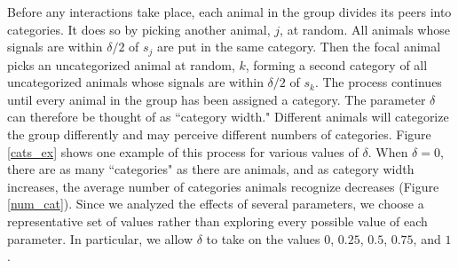 Before any interactions take place, each animal in the group divides its peers into categories. It does so by picking another animal, $j$, at random. All animals whose signals are within $\delta/2$ of $s_j$ are put in the same category. Then the focal animal picks an uncategorized animal at random, $k$, forming a second category of all uncategorized animals whose signals are within $\delta/2$ of $s_k$. The process continues until every animal in the group has been assigned a category. The parameter $\delta$ can therefore be thought of as ``category width."  Different animals will categorize the group differently and may perceive different numbers of categories. Figure \ref{cats_ex} shows one example of this process for various values of $\delta$. When $\delta=0$, there are as many ``categories" as there are animals, and as category width increases, the average number of categories animals recognize decreases (Figure \ref{num_cat}). Since we analyzed the effects of several parameters, we choose a representative set of values rather than exploring every possible value of each parameter. In particular, we allow $\delta$ to take on the values $0$, $0.25$, $0.5$, $0.75$, and $1$.

